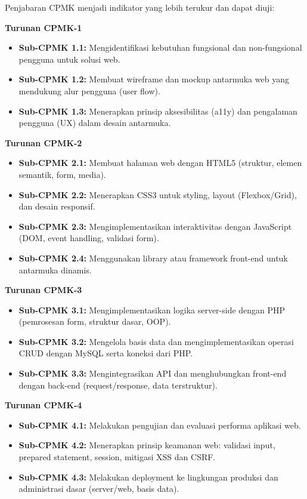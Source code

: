\documentclass[12pt,a4paper]{article}
\begin{document}
Penjabaran CPMK menjadi indikator yang lebih terukur dan dapat diuji:

\textbf{Turunan CPMK-1}
\begin{itemize}[leftmargin=*]
  \item \textbf{Sub-CPMK 1.1:} Mengidentifikasi kebutuhan fungsional dan non-fungsional pengguna untuk solusi web.
  \item \textbf{Sub-CPMK 1.2:} Membuat wireframe dan mockup antarmuka web yang mendukung alur pengguna (user flow).
  \item \textbf{Sub-CPMK 1.3:} Menerapkan prinsip aksesibilitas (a11y) dan pengalaman pengguna (UX) dalam desain antarmuka.
\end{itemize}

\textbf{Turunan CPMK-2}
\begin{itemize}[leftmargin=*]
  \item \textbf{Sub-CPMK 2.1:} Membuat halaman web dengan HTML5 (struktur, elemen semantik, form, media).
  \item \textbf{Sub-CPMK 2.2:} Menerapkan CSS3 untuk styling, layout (Flexbox/Grid), dan desain responsif.
  \item \textbf{Sub-CPMK 2.3:} Mengimplementasikan interaktivitas dengan JavaScript (DOM, event handling, validasi form).
  \item \textbf{Sub-CPMK 2.4:} Menggunakan library atau framework front-end untuk antarmuka dinamis.
\end{itemize}

\textbf{Turunan CPMK-3}
\begin{itemize}[leftmargin=*]
  \item \textbf{Sub-CPMK 3.1:} Mengimplementasikan logika server-side dengan PHP (pemrosesan form, struktur dasar, OOP).
  \item \textbf{Sub-CPMK 3.2:} Mengelola basis data dan mengimplementasikan operasi CRUD dengan MySQL serta koneksi dari PHP.
  \item \textbf{Sub-CPMK 3.3:} Mengintegrasikan API dan menghubungkan front-end dengan back-end (request/response, data terstruktur).
\end{itemize}

\textbf{Turunan CPMK-4}
\begin{itemize}[leftmargin=*]
  \item \textbf{Sub-CPMK 4.1:} Melakukan pengujian dan evaluasi performa aplikasi web.
  \item \textbf{Sub-CPMK 4.2:} Menerapkan prinsip keamanan web: validasi input, prepared statement, session, mitigasi XSS dan CSRF.
  \item \textbf{Sub-CPMK 4.3:} Melakukan deployment ke lingkungan produksi dan administrasi dasar (server/web, basis data).
\end{itemize}
\end{document}
